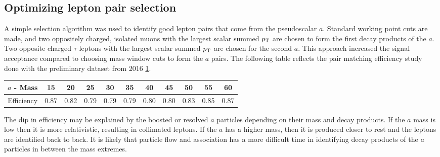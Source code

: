\subsection{Optimizing lepton pair selection}
\label{sec:selection}
A simple selection algorithm was used to identify good lepton pairs that come from the pseudoscalar $a$. 
Standard working point cuts are made, and two oppositely charged, isolated muons with the largest scalar summed $p_{\mathrm{T}}$ are chosen to form the first decay products of the $a$. 
Two opposite charged $\tau$ leptons with the largest scalar summed $p_{\mathrm{T}}$ are chosen for the second $a$. 
This approach increased the signal acceptance compared to choosing mass window cuts to form the $a$ pairs. 
The following table reflects the pair matching efficiency study done with the preliminary dataset from 2016 \ref{tab:paireff}.
\begin{table}[h!tbp]
\begin{center}
    \label{tab:paireff}
\begin{tabular}{|c|c|c|c|c|c|c|c|c|c|c|}\hline
$a$ - Mass & 15     & 20    & 25    & 30    & 35    & 40    & 45    & 50    & 55    & 60 \\\hline
Efficiency & 0.87   & 0.82  &0.79   & 0.79  & 0.79  & 0.80  & 0.80  & 0.83  & 0.85  & 0.87 \\\hline 
\end{tabular}
\end{center}
\end{table}
The dip in efficiency may be explained by the boosted or resolved $a$ particles depending on their mass and decay products. If the $a$ mass is low then it is more relativistic, resulting in collimated leptons. If the $a$ has a higher mass, then it is produced closer to rest and the leptons are identified back to back. It is likely that particle flow and association has a more difficult time in identifying decay products of the $a$ particles in between the mass extremes.

